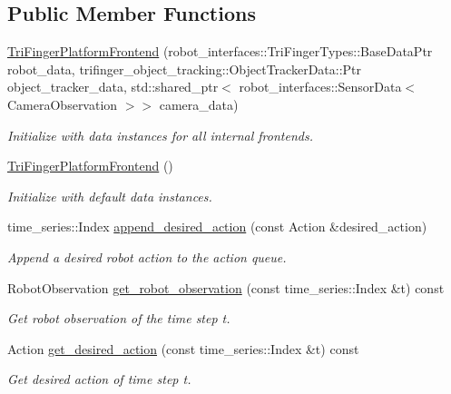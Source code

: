 \subsection*{Public Member Functions}
\begin{DoxyCompactItemize}
\item 
\hyperlink{classrobot__fingers_1_1TriFingerPlatformFrontend_a47150cf36520116808333d5c3e8a2fdc}{Tri\+Finger\+Platform\+Frontend} (robot\+\_\+interfaces\+::\+Tri\+Finger\+Types\+::\+Base\+Data\+Ptr robot\+\_\+data, trifinger\+\_\+object\+\_\+tracking\+::\+Object\+Tracker\+Data\+::\+Ptr object\+\_\+tracker\+\_\+data, std\+::shared\+\_\+ptr$<$ robot\+\_\+interfaces\+::\+Sensor\+Data$<$ Camera\+Observation $>$$>$ camera\+\_\+data)
\begin{DoxyCompactList}\small\item\em Initialize with data instances for all internal frontends. \end{DoxyCompactList}\item 
\hyperlink{classrobot__fingers_1_1TriFingerPlatformFrontend_aea53f5c5b5443f9b481b33392b5caa25}{Tri\+Finger\+Platform\+Frontend} ()
\begin{DoxyCompactList}\small\item\em Initialize with default data instances. \end{DoxyCompactList}\item 
time\+\_\+series\+::\+Index \hyperlink{classrobot__fingers_1_1TriFingerPlatformFrontend_a474d2d6fd6c48fc16ccd60ac2bc21c2f}{append\+\_\+desired\+\_\+action} (const Action \&desired\+\_\+action)
\begin{DoxyCompactList}\small\item\em Append a desired robot action to the action queue. \end{DoxyCompactList}\item 
Robot\+Observation \hyperlink{classrobot__fingers_1_1TriFingerPlatformFrontend_a86149ce45a4ddada714eb0e0fde20e66}{get\+\_\+robot\+\_\+observation} (const time\+\_\+series\+::\+Index \&t) const
\begin{DoxyCompactList}\small\item\em Get robot observation of the time step t. \end{DoxyCompactList}\item 
Action \hyperlink{classrobot__fingers_1_1TriFingerPlatformFrontend_acdb76e148024bfdcb59bf06a92f30222}{get\+\_\+desired\+\_\+action} (const time\+\_\+series\+::\+Index \&t) const
\begin{DoxyCompactList}\small\item\em Get desired action of time step t. \end{DoxyCompactList}\item 
$$
\end{DoxyCompactItemize}
